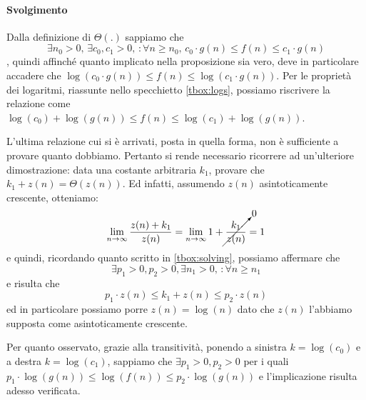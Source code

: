 \documentclass[11pt,a4paper,oneside]{article}
\begin{document}
\paragraph*{Svolgimento} Dalla definizione di $\Theta(.)$ sappiamo che $$\exists n_0 > 0,\,\exists c_0,c_1 > 0,\,:\forall n \geq n_0,\,c_0 \cdot g(n) \leq f(n) \leq c_1 \cdot g(n)$$, quindi affinché quanto implicato nella proposizione sia vero, deve in particolare accadere che $\log(c_0 \cdot g(n)) \leq f(n) \leq \log(c_1 \cdot g(n))$. Per le proprietà dei logaritmi, riassunte nello specchietto \ref{tbox:logs}, possiamo riscrivere la relazione come $\log(c_0) +\log (g(n)) \leq f(n) \leq \log(c_1) + \log(g(n))$.
\begin{tcolorbox}[title=Ulteriori osservazioni]
	L'ultima relazione cui si è arrivati, posta in quella forma, non è sufficiente a provare quanto dobbiamo. Pertanto si rende necessario ricorrere ad un'ulteriore dimostrazione: data una costante arbitraria $k_1$, provare che $k_1+z(n)=\Theta(z(n))$.
	Ed infatti, assumendo $z(n)$ asintoticamente crescente, otteniamo:
	$$\lim_{n\to \infty} \frac{z(n)+k_1}{z(n)} = \lim_{n\to \infty} 1+ \cancelto{0}{\frac{k_1}{z(n)}} = 1$$ e quindi, ricordando quanto scritto in \ref{tbox:solving}, possiamo affermare che $$\exists p_1 > 0,p_2>0,\exists n_1 > 0,\,:\forall n \geq n_1$$ e risulta che $$p_1\cdot z(n) \leq k_1+z(n) \leq p_2 \cdot z(n)$$ ed in particolare possiamo porre $z(n) = \log(n)$ dato che $z(n)$ l'abbiamo supposta come asintoticamente crescente.
\end{tcolorbox}
Per quanto osservato, grazie alla transitività, ponendo a sinistra $k = \log(c_0)$ e a destra $k = \log(c_1)$, sappiamo che $\exists p_1 > 0,p_2>0$ per i quali $p_1\cdot \log(g(n)) \leq \log(f(n)) \leq p_2 \cdot \log(g(n))$ e l'implicazione risulta adesso verificata.
\end{document}
